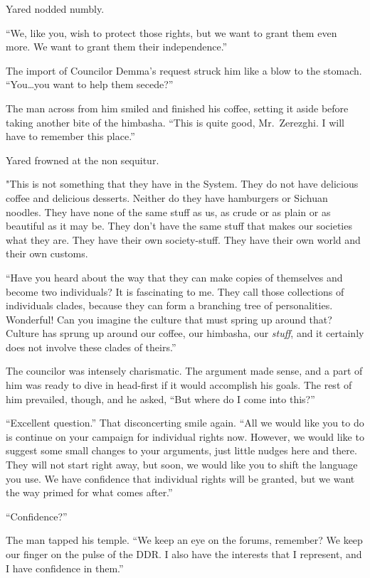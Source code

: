 Yared nodded numbly.

``We, like you, wish to protect those rights, but we want to grant them even more. We want to grant them their independence.''

The import of Councilor Demma's request struck him like a blow to the stomach. ``You\ldots you want to help them secede?''

The man across from him smiled and finished his coffee, setting it aside before taking another bite of the himbasha. ``This is quite good, Mr.~Zerezghi. I will have to remember this place.''

Yared frowned at the non sequitur.

"This is not something that they have in the System. They do not have delicious coffee and delicious desserts. Neither do they have hamburgers or Sichuan noodles. They have none of the same stuff as us, as crude or as plain or as beautiful as it may be. They don't have the same stuff that makes our societies what they are. They have their own society-stuff. They have their own world and their own customs.

``Have you heard about the way that they can make copies of themselves and become two individuals? It is fascinating to me. They call those collections of individuals clades, because they can form a branching tree of personalities. Wonderful! Can you imagine the culture that must spring up around that? Culture has sprung up around our coffee, our himbasha, our \emph{stuff}, and it certainly does not involve these clades of theirs.''

The councilor was intensely charismatic. The argument made sense, and a part of him was ready to dive in head-first if it would accomplish his goals. The rest of him prevailed, though, and he asked, ``But where do I come into this?''

``Excellent question.'' That disconcerting smile again. ``All we would like you to do is continue on your campaign for individual rights now. However, we would like to suggest some small changes to your arguments, just little nudges here and there. They will not start right away, but soon, we would like you to shift the language you use. We have confidence that individual rights will be granted, but we want the way primed for what comes after.''

``Confidence?''

The man tapped his temple. ``We keep an eye on the forums, remember? We keep our finger on the pulse of the DDR. I also have the interests that I represent, and I have confidence in them.''

